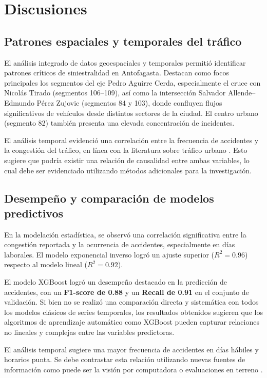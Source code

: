 \documentclass[12pt]{article}
\begin{document}
\section{Discusiones}

\subsection{Patrones espaciales y temporales del tráfico}

El análisis integrado de datos geoespaciales y temporales permitió identificar patrones críticos de siniestralidad en Antofagasta. Destacan como focos principales los segmentos del eje Pedro Aguirre Cerda, especialmente el cruce con Nicolás Tirado (segmentos 106–109), así como la intersección Salvador Allende–Edmundo Pérez Zujovic (segmentos 84 y 103), donde confluyen flujos significativos de vehículos desde distintos sectores de la ciudad. El centro urbano (segmento 82) también presenta una elevada concentración de incidentes.

El análisis temporal evidenció una correlación entre la frecuencia de accidentes y la congestión del tráfico, en línea con la literatura sobre tráfico urbano \parencite{berhanu2024}. Esto sugiere que podría existir una relación de causalidad entre ambas variables, lo cual debe ser evidenciado utilizando métodos adicionales para la investigación.

\subsection{Desempeño y comparación de modelos predictivos}

En la modelación estadística, se observó una correlación significativa entre la congestión reportada y la ocurrencia de accidentes, especialmente en días laborales. El modelo exponencial inverso logró un ajuste superior ($R^2 = 0.96$) respecto al modelo lineal ($R^2 = 0.92$).

El modelo XGBoost logró un desempeño destacado en la predicción de accidentes, con un \textbf{F1-score de 0.88} y un \textbf{Recall de 0.91} en el conjunto de validación. Si bien no se realizó una comparación directa y sistemática con todos los modelos clásicos de series temporales, los resultados obtenidos sugieren que los algoritmos de aprendizaje automático como XGBoost pueden capturar relaciones no lineales y complejas entre las variables predictoras.

El análisis temporal sugiere una mayor frecuencia de accidentes en días hábiles y horarios punta. Se debe contrastar esta relación utilizando nuevas fuentes de información como puede ser la visión por computadora o evaluaciones en terreno \parencite{goodall2019}.
\end{document}
